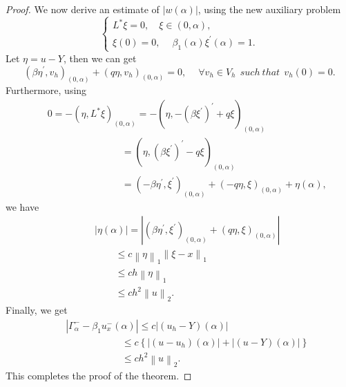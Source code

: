 \documentclass[11pt]{article}
\numberwithin{equation}{section}
\begin{document}
\begin{proof}
We now derive an estimate of $\left|w\left(\alpha\right)\right|$, using the new auxiliary problem
\begin{equation*}\label{}
\begin{cases}
 L^{*}\xi =0 ,\quad   \xi\in \left(0 , \alpha\right),\\
\xi\left(0\right)=0 ,\quad ~\beta_{1}\left(\alpha\right)\xi^{'}\left(\alpha\right)=1 .
 \end{cases}
\end{equation*}
Let $\eta=u-Y$, then we can get
\begin{equation}\label{}
\left(\beta\eta^{'} , v_{h}\right)_{\left(0,\alpha\right)}+\left(q\eta , v_{h}\right)_{\left(0,\alpha\right)}=0 , \quad~\forall v_{h}\in V_{h}~~ such~that ~~v_{h}\left(0\right)=0.
\end{equation}
Furthermore, using
\begin{eqnarray*}
&&0=-\left(\eta , L^{*}\xi\right)_{\left(0,\alpha\right)}=-\left(\eta , -\left(\beta\xi^{'}\right)^{'}+q\xi\right)_{\left(0,\alpha\right)}\\
&&\qquad\quad\qquad\qquad~~~=\left(\eta , \left(\beta\xi^{'}\right)^{'}-q\xi\right)_{\left(0,\alpha\right)}\\
&&\qquad\quad\qquad\qquad~~~=\left(-\beta\eta^{'} , \xi^{'}\right)_{\left(0,\alpha\right)}+\left(-q\eta , \xi \right)_{\left(0,\alpha\right)}+\eta\left(\alpha\right),
\end{eqnarray*}
we have
\begin{eqnarray*}
&&\left|\eta\left(\alpha\right)\right|=\left|\left(\beta\eta^{'} , \xi^{'}\right)_{\left(0,\alpha\right)}+\left(q\eta , \xi\right)_{\left(0,\alpha\right)}\right|\\
&&\quad~~~~~\leq c\left\|\eta\right\|_{1}\left\|\xi-x\right\|_{1}\\
&&\quad~~~~~\leq ch\left\|\eta\right\|_{1}\\
&&\quad~~~~~\leq ch^{2}\left\|u\right\|_{2}.
\end{eqnarray*}
Finally, we get
\begin{eqnarray*}
&&\left|\Gamma_{\alpha}^{-}-\beta_{1}u_{x}^{-}\left(\alpha\right)\right|\leq c\left|\left(u_{h}-Y\right)\left(\alpha\right)\right|\\
&&~~~~\quad\qquad\quad~~~~\leq c\left\{\left|\left(u-u_{h}\right)\left(\alpha\right)\right|+\left|\left(u-Y\right)\left(\alpha\right)\right|\right\}\\
&&~~~~\quad\qquad\quad~~~~\leq ch^{2}\left\|u\right\|_{2}.
\end{eqnarray*}
This completes the proof of the theorem.
\end{proof}
\end{document}
